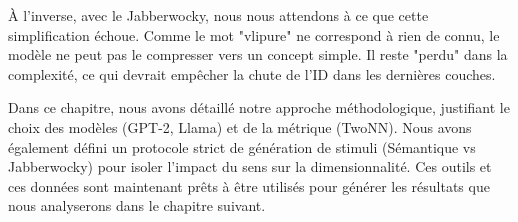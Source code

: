 À l'inverse, avec le Jabberwocky, nous nous attendons à ce que cette simplification échoue. Comme le mot "vlipure" ne correspond à rien de connu, le modèle ne peut pas le compresser vers un concept simple. Il reste "perdu" dans la complexité, ce qui devrait empêcher la chute de l'ID dans les dernières couches.

Dans ce chapitre, nous avons détaillé notre approche méthodologique, justifiant le choix des modèles (GPT-2, Llama) et de la métrique (TwoNN). Nous avons également défini un protocole strict de génération de stimuli (Sémantique vs Jabberwocky) pour isoler l'impact du sens sur la dimensionnalité. Ces outils et ces données sont maintenant prêts à être utilisés pour générer les résultats que nous analyserons dans le chapitre suivant.